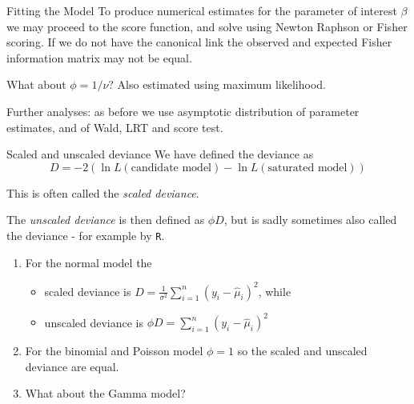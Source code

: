 \documentclass[
  ignorenonframetext,
]{beamer}
\providecommand{\tightlist}{%
  \setlength{\itemsep}{0pt}\setlength{\parskip}{0pt}}
\begin{document}
\begin{frame}{Fitting the Model}
\protect\hypertarget{fitting-the-model}{}
To produce numerical estimates for the parameter of interest \(\beta\)
we may proceed to the score function, and solve using Newton Raphson or
Fisher scoring. If we do not have the canonical link the observed and
expected Fisher information matrix may not be equal.

What about \(\phi=1/\nu\)? Also estimated using maximum likelihood.

Further analyses: as before we use asymptotic distribution of parameter
estimates, and of Wald, LRT and score test.
\end{frame}

\begin{frame}[fragile]{Scaled and unscaled deviance}
\protect\hypertarget{scaled-and-unscaled-deviance}{}
We have defined the deviance as
\[D=-2(\ln L(\text{candidate model})-\ln L(\text{saturated model}))\]

This is often called the \emph{scaled deviance}.

The \emph{unscaled deviance} is then defined as \(\phi D\), but is sadly
sometimes also called the deviance - for example by \texttt{R}.

\begin{enumerate}
\item
  For the normal model the

  \begin{itemize}
  \tightlist
  \item
    scaled deviance is
    \(D=\frac{1}{\sigma^2}\sum_{i=1}^n (y_i-\hat{\mu}_i)^2\), while
  \item
    unscaled deviance is \(\phi D=\sum_{i=1}^n (y_i-\hat{\mu}_i)^2\)
  \end{itemize}
\item
  For the binomial and Poisson model \(\phi=1\) so the scaled and
  unscaled deviance are equal.
\item
  What about the Gamma model?
\end{enumerate}
\end{frame}
\end{document}
